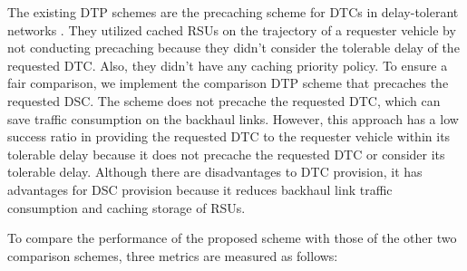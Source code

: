 \documentclass[journal]{IEEEtran}
\begin{document}
The existing DTP schemes are the precaching scheme for DTCs in delay-tolerant networks \cite{Qi2017, Xia2020}.
They utilized cached RSUs on the trajectory of a requester vehicle by not conducting precaching because they didn't consider the tolerable delay of the requested DTC.
Also, they didn't have any caching priority policy.
To ensure a fair comparison, we implement the comparison DTP scheme that precaches the requested DSC.
The scheme does not precache the requested DTC, which can save traffic consumption on the backhaul links.
However, this approach has a low success ratio in providing the requested DTC to the requester vehicle within its tolerable delay because it does not precache the requested DTC or consider its tolerable delay.
Although there are disadvantages to DTC provision, it has advantages for DSC provision because it reduces backhaul link traffic consumption and caching storage of RSUs.

To compare the performance of the proposed scheme with those of the other two comparison schemes, three metrics are measured as follows:
\end{document}

